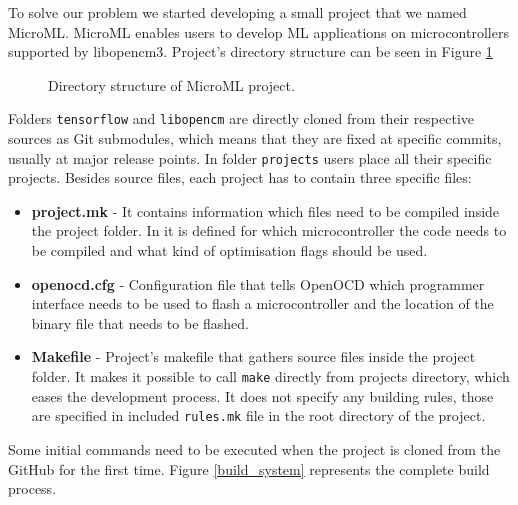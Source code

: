 To solve our problem we started developing a small project that we named MicroML\footnotemark.
MicroML enables users to develop ML applications on microcontrollers supported by libopencm3.
Project's directory structure can be seen in Figure \ref{microml_dir}


\begin{figure}[ht] 
    \centering
    \begin{minipage}{7cm}
    \end{minipage}
    \caption{ Directory structure of MicroML project.}
    \label{microml_dir}
\end{figure}

Folders \verb|tensorflow| and \verb|libopencm| are directly cloned from their respective sources as Git submodules, which means that they are fixed at specific commits, usually at major release points.
In folder \verb|projects| users place all their specific projects.
Besides source files, each project has to contain three specific files:

\begin{itemize}
    \item \textbf{project.mk} - It contains information which files need to be compiled inside the project folder. In it is defined for which microcontroller the code needs to be compiled and what kind of optimisation flags should be used.
    \item \textbf{openocd.cfg} - Configuration file that tells OpenOCD which programmer interface needs to be used to flash a microcontroller and the location of the binary file that needs to be flashed.
    \item \textbf{Makefile} - Project's makefile that gathers source files inside the project folder. It makes it possible to call \verb|make| directly from projects directory, which eases the development process. It does not specify any building rules, those are specified in included \verb|rules.mk| file in the root directory of the project.
\end{itemize}

Some initial commands need to be executed when the project is cloned from the GitHub for the first time. 
Figure \ref{build_system} represents the complete build process.

